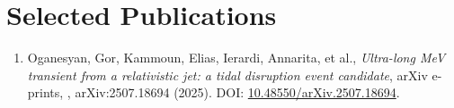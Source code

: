 \section*{Selected Publications}
\begin{enumerate}[leftmargin=1.2cm, label=\textbf{\arabic*.}]
    \item Oganesyan, Gor, Kammoun, Elias, Ierardi, Annarita, et al., \textit{Ultra-long MeV transient from a relativistic jet: a tidal disruption event candidate}, arXiv e-prints, , arXiv:2507.18694 (2025). DOI: \href{https://doi.org/10.48550/arXiv.2507.18694}{10.48550/arXiv.2507.18694}.
\end{enumerate}